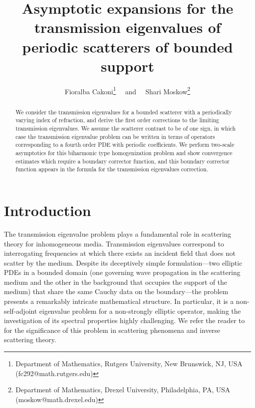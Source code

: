 \documentclass[12pt]{article}
\title{Asymptotic expansions for the transmission eigenvalues of periodic scatterers of bounded support}
\author{Fioralba Cakoni\footnote{Department of Mathematics, Rutgers University, New Brunswick, NJ, USA (fc292@math.rutgers.edu)} \ \ and \ \ Shari Moskow\footnote{Department of Mathematics, Drexel University, Philadelphia, PA, USA (moskow@math.drexel.edu)}}
\date{}
\begin{document}
\maketitle
\begin{abstract} 
We consider the transmission eigenvalues  for a bounded scatterer with a periodically varying index of refraction, and derive the first order corrections to the limiting transmission eigenvalues. We assume the scatterer contrast to be of one sign, in which case the transmission eigenvalue problem can be written in terms of operators corresponding to a fourth order PDE with periodic coefficients. We perform two-scale asymptotics for this biharmonic type homogenization problem and show convergence estimates which   require a boundary corrector function, and this boundary corrector function appears in the formula for the transmission eigenvalues correction.  
\end{abstract}

\section{Introduction}
The transmission eigenvalue problem plays a fundamental role in scattering theory for inhomogeneous media. Transmission eigenvalues correspond to interrogating frequencies at which there exists an incident field that does not scatter by the medium. Despite its deceptively simple formulation—two elliptic PDEs in a bounded domain (one governing wave propagation in the scattering medium and the other in the background that occupies the support of the medium) that share the same Cauchy data on the boundary—the problem presents a remarkably intricate mathematical structure. In particular, it is a non-self-adjoint eigenvalue problem for a non-strongly elliptic operator, making the investigation of its spectral properties highly challenging. We refer the reader to \cite{CCH-book} for the significance of this problem in scattering phenomena and inverse scattering theory.
\end{document}
